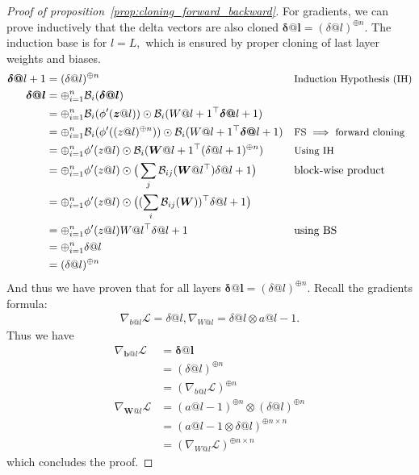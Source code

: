 \documentclass{article}
\newcommand{\1}{\mathbf{1}}
\newcommand{\Loss}{\mathcal{L}}
\newcommand{\R}[2]{\mathcal{R}_{#2}(#1)}
\renewcommand{\R}[2]{({#1})^{\oplus #2}}
\newcommand{\bl}[2]{\mathcal{B}_{#2}({#1})}
\newcommand{\B}[1]{\boldsymbol{#1}}
\newcommand{\T}{\ensuremath{{}^{\top}}}
\begin{document}
\begin{proof}[Proof of proposition~\ref{prop:cloning_forward_backward}]
    For gradients, we can prove inductively that the delta vectors are also cloned $\B \delta@l = \R{\delta@l}{n}.$ The induction base is for $l=L,$ which is ensured by proper cloning of last layer weights and biases. 
    \begin{align*}
        \B\delta@{l+1} &= \R{\delta@l}{n}  && \text{\small Induction Hypothesis (IH)}\\
        \B\delta@l &=\oplus_{i=1}^n \bl{\B\delta@l}{i}\\
        &= \oplus_{i=1}^n \bl{\phi'(\B z@l)}{i} \odot \bl{W@{l+1}\T \B \delta@{l+1}}{i} \\
        &= \oplus_{i=1}^n \bl{\phi'(\R{z@l}{n})}{i} \odot \bl{W@{l+1}\T \B \delta@{l+1}}{i} && \text{\small FS $\implies$ forward cloning} \\
        &= \oplus_{i=1}^n \phi'(z@l) \odot \bl{\B W@{l+1}\T \R{\delta@{l+1}}{n}}{i}&& \text{\small Using IH } \\
        &=\oplus_{i=1}^n \phi'(z@l) \odot \big(\sum_{j} \bl{\B W@l\T}{ij}\delta@{l+1} \big)&&\text{block-wise product}\\
        &=\oplus_{i=1}^n \phi'(z@l) \odot\big( (\sum_{i} \bl{\B W}{ij})\T \delta@{l+1}\big)\\
        &= \oplus_{i=1}^n \phi'(z@l) W@l\T \delta@{l+1}&&\text{using BS} \\
        &= \oplus_{i=1}^n \delta@l\\
        &=\R{\delta@l}{n} 
    \end{align*}
    And thus we have proven that for all layers $\B\delta@l = \R{\delta@l}{n} . $ Recall the gradients formula:
    \begin{align*}
        \nabla_{b@l}\Loss = \delta@l, \nabla_{W@l} = \delta@l\otimes a@{l-1}.
    \end{align*}
    Thus we have 
    \begin{align*}
        \nabla_{\B b@l}\Loss &=  \B \delta@l \\
        &= \R{\delta@l}{n}\\
        &= \R{\nabla_{b@l}\Loss}{n}\\
       \nabla_{\B W@l}\Loss &= \R{a@{l-1}}{n}\otimes  \R{\delta@l}{n} \\
       &= \R{a@{l-1}\otimes \delta@ l}{n\times n} \\
       &= \R{\nabla_{W@l}\Loss}{n\times n}
    \end{align*}
    which concludes the proof. 
\end{proof}
\end{document}
